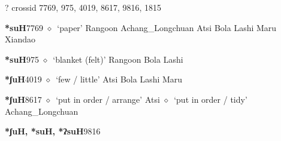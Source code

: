 ?
  {\tiny crossid 7769, 975, 4019, 8617, 9816, 1815}
  \begin{list}{}{\leftmargin=1.5em \itemindent=-1.5em}
  \item {\footnotesize \textbf{*suH}}{\tiny 7769}
         $\diamond$~`paper'
         Rangoon 
\hspace{1ex}
         Achang\_Longchuan 
\hspace{1ex}
         Atsi 
\hspace{1ex}
         Bola 
\hspace{1ex}
         Lashi 
\hspace{1ex}
         Maru 
\hspace{1ex}
         Xiandao 
  \item {\footnotesize \textbf{*suH}}{\tiny 975}
\hspace{1ex}
         $\diamond$~`blanket (felt)'
         Rangoon 
\hspace{1ex}
         Bola 
\hspace{1ex}
         Lashi 
  \item {\footnotesize \textbf{*ʃuH}}{\tiny 4019}
\hspace{1ex}
         $\diamond$~`few / little'
         Atsi 
\hspace{1ex}
         Bola 
\hspace{1ex}
         Lashi 
\hspace{1ex}
         Maru 
  \item {\footnotesize \textbf{*ʃuH}}{\tiny 8617}
\hspace{1ex}
         $\diamond$~`put in order / arrange'
         Atsi 
\hspace{1ex}
         $\diamond$~`put in order / tidy'
         Achang\_Longchuan 
  \item {\footnotesize \textbf{*ʃuH, *suH, *ʔsuH}}{\tiny 9816}
\hspace{1ex}

\end{list}

